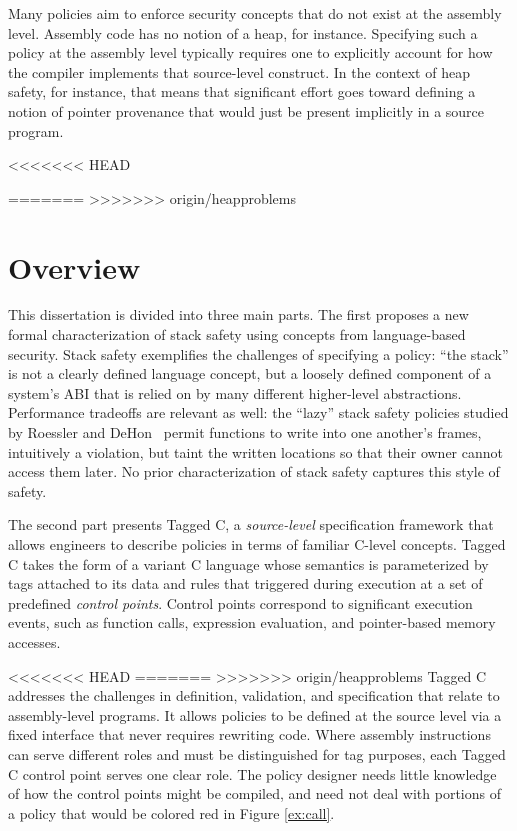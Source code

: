 \documentclass{report}
\begin{document}
Many policies aim to enforce security concepts that do not exist at the assembly level. Assembly
code has no notion of a heap, for instance. Specifying such a policy at the assembly
level typically requires one to explicitly account for how the compiler implements that source-level
construct. In the context of heap safety, for instance, that means that significant effort goes
toward defining a notion of pointer provenance that would just be present implicitly in a
source program.

<<<<<<< HEAD

=======
>>>>>>> origin/heapproblems
\section{Overview}

This dissertation is divided into three main parts. The first proposes a new formal characterization
of stack safety using concepts from language-based security. Stack safety exemplifies the challenges
of specifying a policy: ``the stack'' is not a clearly defined language concept, but a loosely
defined component of a system's ABI that is relied on by many different higher-level abstractions.
Performance tradeoffs are relevant as well: the ``lazy'' stack safety policies studied by
Roessler and DeHon~\cite{RoesslerD18} permit functions to write into one another's
frames, intuitively a violation, but taint the written locations so that their owner cannot
access them later. No prior characterization of stack safety captures this style of safety.

The second part presents Tagged C, a \emph{source-level} specification framework that allows
engineers to describe policies in terms of familiar C-level concepts.
Tagged C takes the form of a variant C language whose semantics is parameterized by tags
attached to its data and rules that triggered during execution at a set of predefined
\emph{control points}. Control points correspond to significant execution events, such as
function calls, expression evaluation, and pointer-based memory accesses.

<<<<<<< HEAD
=======
>>>>>>> origin/heapproblems
Tagged C addresses the challenges in definition, validation, and specification that relate to
assembly-level programs. It allows policies to be defined at the source level via a fixed interface
that never requires rewriting code. Where assembly instructions can serve different roles and must
be distinguished for tag purposes, each Tagged C control point serves one clear role. The policy
designer needs little knowledge of how the control points might be compiled, and need not
deal with portions of a policy that would be colored red in Figure \ref{ex:call}.
\end{document}
